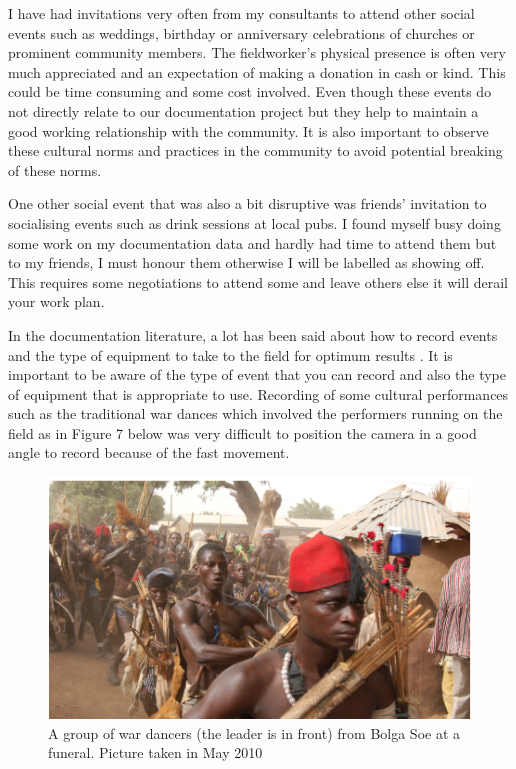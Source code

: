 \documentclass[output=paper,colorlinks,citecolor=brown]{langscibook}
\begin{document}
I have had invitations very often from my consultants to attend other social events such as weddings, birthday or anniversary celebrations of churches or prominent community members. The fieldworker’s physical presence is often very much appreciated and an expectation of making a donation in cash or kind. This could be time consuming and some cost involved. Even though these events do not directly relate to our documentation project but they help to maintain a good working relationship with the community. It is also important to observe these cultural norms and practices in the community to avoid potential breaking of these norms.  

One other social event that was also a bit disruptive was friends’ invitation to socialising events such as drink sessions at local pubs. I found myself busy doing some work on my documentation data and hardly had time to attend them but to my friends, I must honour them otherwise I will be labelled as showing off.  This requires some negotiations to attend some and leave others else it will derail your work plan.

In the documentation literature, a lot has been said about how to record events and the type of equipment to take to the field for optimum results \citep{Bowern2015, Woodbury2003, AustinGrenoble2007}.  It is important to be aware of the type of event that you can record and also the type of equipment that is appropriate to use. Recording of some cultural performances such as the traditional war dances which involved the performers running on the field as in Figure 7 below was very difficult to position the camera in a good angle to record because of the fast movement.  

\begin{figure}
\includegraphics[width=\textwidth]{figures/bolga_soe.png}
\caption{A group of war dancers (the leader is in front) from Bolga Soe at a funeral. Picture taken in May 2010}
\end{figure}
\end{document}
